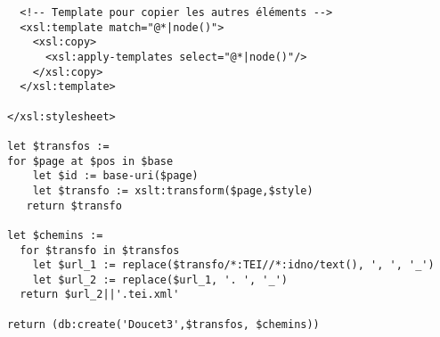\begin{verbatim}
  <!-- Template pour copier les autres éléments -->
  <xsl:template match="@*|node()">
    <xsl:copy>
      <xsl:apply-templates select="@*|node()"/>
    </xsl:copy>
  </xsl:template>

</xsl:stylesheet>

let $transfos :=
for $page at $pos in $base
    let $id := base-uri($page)
    let $transfo := xslt:transform($page,$style)
   return $transfo

let $chemins := 
  for $transfo in $transfos
    let $url_1 := replace($transfo/*:TEI//*:idno/text(), ', ', '_')
    let $url_2 := replace($url_1, '. ', '_')
  return $url_2||'.tei.xml'

return (db:create('Doucet3',$transfos, $chemins))
\end{verbatim}